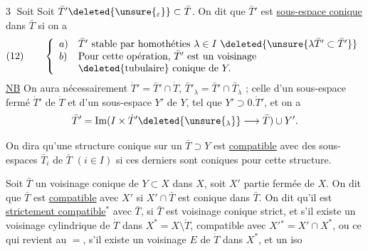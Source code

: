 \textcircled{3} Soit
Soit $\bar T'\deleted{\unsure{_\varepsilon}}\subset\bar T$.
On dit que $\bar T'$ est \uline{sous-espace conique} dans $\bar T$ si on a
\[
(12)\qquad\left\{\begin{array}{ll}
a)&\bar T'\text{ stable par homothéties }\lambda\in I\
\deleted{\unsure{\lambda\bar T'\subset\bar T'}}\\
b)&\text{Pour cette opération, }\bar T'\text{ est un voisinage}\\
&\deleted{\text{tubulaire}}\text{ conique de }Y.
\end{array}\right.
\]
\uline{NB} On aura nécessairement $\dot T'=\bar T'\cap\dot T$,
$\bar T'_\lambda=\bar T'\cap\bar T_\lambda$ ;
celle d'un sous-espace fermé $\dot T'$ de $\dot T$
et d'un sous-espace $Y'$ de $Y$, tel que $Y'\supset0.\dot T'$, et
on a
\[
\bar T'=\operatorname{Im}(I\times\dot T'
\deleted{\unsure{_\lambda}}\longrightarrow\bar T)\cup Y'.
\]

On dira qu'une structure conique sur
un $\bar T\supset Y$ est \uline{compatible} avec des sous-espaces
\inserted{fermés} $\bar T_i$ de $\bar T$ $(i\in I)$ si ces derniers
sont coniques pour cette structure.

Soit $\bar T$ un voisinage conique de $Y\subset X$
dans $X$, soit $X'$ partie fermée de $X$. On
dit que $\bar T$ est \uline{compatible} avec $X'$ si
$X'\cap\bar T$ est conique dans $\bar T$. On dit qu'il
est \uline{strictement compatible}$^{*}$ avec $\bar T$, si
$\bar T$ est voisinage conique strict, et s'il existe
un voisinage cylindrique de $\dot T$ dans
$X^*=X\setminus\mathring T$, compatible avec
$X'{}^*=X'\cap X^*$,
ou ce qui revient au $=$, s'il existe un
voisinage $E$ de $\dot T$ dans $X^*$, et un iso
